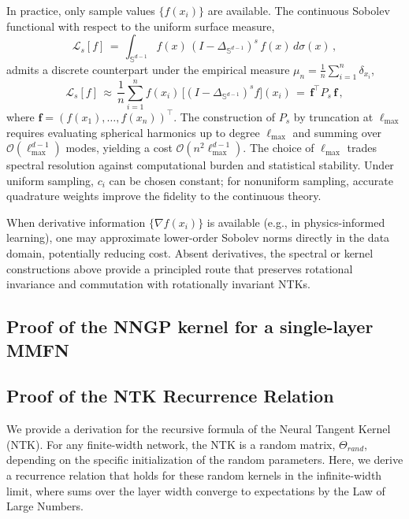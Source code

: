 \documentclass[a4paper]{article}
\begin{document}
In practice, only sample values $\{f(x_i)\}$ are available. The continuous Sobolev functional with respect to the uniform surface measure,
\[
\mathcal{L}_s[f] \,=\, \int_{\mathbb{S}^{d-1}} f(x)\, (I - \Delta_{\mathbb{S}^{d-1}})^{s}\, f(x)\, d\sigma(x)\,,
\]
admits a discrete counterpart under the empirical measure $\mu_n = \tfrac{1}{n}\sum_{i=1}^n \delta_{x_i}$,
\[
\mathcal{L}_s[f] \,\approx\, \frac{1}{n}\sum_{i=1}^n f(x_i)\, \bigl[(I - \Delta_{\mathbb{S}^{d-1}})^{s} f\bigr](x_i) \,=\, \mathbf{f}^\top P_s\, \mathbf{f}\,,
\]
where $\mathbf{f} = (f(x_1),\ldots,f(x_n))^\top$. The construction of $P_s$ by truncation at $\ell_{\max}$ requires evaluating spherical harmonics up to degree $\ell_{\max}$ and summing over $\mathcal{O}(\ell_{\max}^{d-1})$ modes, yielding a cost $\mathcal{O}(n^2 \ell_{\max}^{d-1})$. The choice of $\ell_{\max}$ trades spectral resolution against computational burden and statistical stability. Under uniform sampling, $c_i$ can be chosen constant; for nonuniform sampling, accurate quadrature weights improve the fidelity to the continuous theory.

\begin{remark}
When derivative information $\{\nabla f(x_i)\}$ is available (e.g., in physics-informed learning), one may approximate lower-order Sobolev norms directly in the data domain, potentially reducing cost. Absent derivatives, the spectral or kernel constructions above provide a principled route that preserves rotational invariance and commutation with rotationally invariant NTKs.
\end{remark}


\newpage
















\subsection{Proof of the NNGP kernel for a single-layer MMFN}

\subsection{Proof of the NTK Recurrence Relation}
We provide a derivation for the recursive formula of the Neural Tangent Kernel (NTK). For any finite-width network, the NTK is a random matrix, $\Theta_{rand}$, depending on the specific initialization of the random parameters. Here, we derive a recurrence relation that holds for these random kernels in the infinite-width limit, where sums over the layer width converge to expectations by the Law of Large Numbers.
\end{document}
